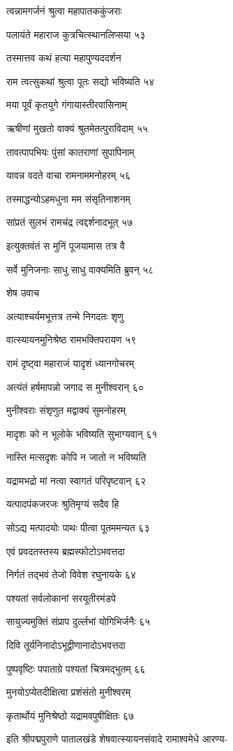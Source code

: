 त्वन्नामगर्जनं श्रुत्वा महापातककुंजराः

पलायंते महाराज कुत्रचित्स्थानलिप्सया ५३

तस्मात्तव कथं हत्या महापुण्यददर्शन

राम त्वत्सुकथां श्रुत्वा पूतः सद्यो भविष्यति ५४

मया पूर्वं कृतयुगे गंगायास्तीरवासिनाम्

ऋषीणां मुखतो वाक्यं श्रुतमेतत्पुराविदाम् ५५

तावत्पापभियः पुंसां कातराणां सुपापिनाम्

यावन्न वदते वाचा रामनाममनोहरम् ५६

तस्माद्धन्योऽहमधुना मम संसृतिनाशनम्

सांप्रतं सुलभं रामचंद्र त्वद्दर्शनादभूत् ५७

इत्युक्तवंतं स मुनिं पूजयामास तत्र वै

सर्वे मुनिजनाः साधु साधु वाक्यमिति ब्रुवन् ५८

शेष उवाच

अत्याश्चर्यमभूत्तत्र तन्मे निगदतः शृणु

वात्स्यायनमुनिश्रेष्ठ रामभक्तिपरायण ५९

रामं दृष्ट्वा महाराजं यादृशं ध्यानगोचरम्

अत्यंतं हर्षमापन्नो जगाद स मुनीश्वरान् ६०

मुनीश्वराः संशृणुत मद्वाक्यं सुमनोहरम्

मादृशः को न भूलोके भविष्यति सुभाग्यवान् ६१

नास्ति मत्सदृशः कोपि न जातो न भविष्यति

यद्रामभद्रो मां नत्वा स्वागतं परिपृष्टवान् ६२

यत्पादपंकजरजः श्रुतिमृग्यं सदैव हि

सोऽद्य मत्पादयोः पाथः पीत्वा पूतममन्यत ६३

एवं प्रवदतस्तस्य ब्रह्मस्फोटोऽभवत्तदा

निर्गतं तद्भवं तेजो विवेश रघुनायके ६४

पश्यतां सर्वलोकानां सरयूतीरमंडपे

सायुज्यमुक्तिं संप्राप दुर्ल्लभां योगिभिर्जनैः ६५

दिवि तूर्यनिनादोऽभूद्वीणानादोऽभवत्तदा

पुष्पवृष्टिः पपाताग्रे पश्यतां चित्रमद्भुतम् ६६

मुनयोऽप्येतदीक्षित्वा प्रशंसंतो मुनीश्वरम्

कृतार्थोयं मुनिश्रेष्ठो यद्रामवपुषीक्षितः ६७

इति श्रीपद्मपुराणे पातालखंडे शेषवात्स्यायनसंवादे रामाश्वमेधे आरण्य-

